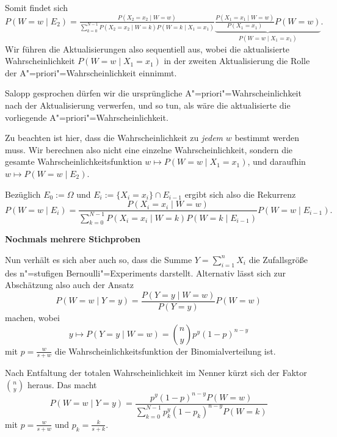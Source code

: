 \documentclass[8pt]{beamer}
\newcommand{\strong}[1]{\textsf{\textbf{#1}}}
\newcommand{\parspace}{\vspace{0.8em}}
\newcommand{\centerheadline}[1]{%
  \begin{center}\strong{#1}\end{center}}
\begin{document}
\begin{frame}
Somit findet sich
\[P(W=w\mid E_2) = \tfrac{P(X_2=x_2\mid W=w)}{\sum_{k=0}^{N-1} P(X_2=x_2\mid W=k)P(W=k\mid X_1=x_1)}\underbrace{\tfrac{P(X_1=x_1\mid W=w)}{P(X_1=x_1)}P(W=w)}_{P(W=w\mid X_1=x_1)}.\]\pause
Wir führen die Aktualisierungen also sequentiell aus, wobei die
aktualisierte Wahrscheinlichkeit $P(W=w\mid X_1=x_1)$ in der zweiten
Aktualisierung die Rolle der A"=priori"=Wahrscheinlichkeit einnimmt.\pause

\parspace
Salopp gesprochen dürfen wir die ursprüngliche A"=priori"=Wahrscheinlichkeit
nach der Aktualisierung verwerfen, und so tun, als wäre die aktualisierte
die vorliegende A"=priori"=Wahrscheinlichkeit.\pause

\parspace
Zu beachten ist hier, dass die Wahrscheinlichkeit zu \emph{jedem} $w$ bestimmt
werden muss. Wir berechnen also nicht eine einzelne Wahrscheinlichkeit, sondern
die gesamte Wahrscheinlichkeitsfunktion $w\mapsto P(W=w\mid X_1=x_1)$,
und daraufhin $w\mapsto P(W=w\mid E_2)$.
\end{frame}

\begin{frame}
Bezüglich $E_0:=\Omega$ und $E_i:=\{X_i=x_i\}\cap E_{i-1}$ ergibt sich also die Rekurrenz
\[P(W=w\mid E_i) = \frac{P(X_i=x_i\mid W=w)}{\sum_{k=0}^{N-1}
P(X_i=x_i\mid W=k)P(W=k\mid E_{i-1})}P(W=w\mid E_{i-1}).\]
\end{frame}

\begin{frame}
\centerheadline{Nochmals mehrere Stichproben}
\end{frame}

\begin{frame}
Nun verhält es sich aber auch so, dass die Summe $Y=\sum_{i=1}^n X_i$
die Zufallsgröße des n"=stufigen Bernoulli"=Experiments darstellt.
Alternativ lässt sich zur Abschätzung also auch der Ansatz
\[P(W=w\mid Y=y) = \frac{P(Y=y\mid W=w)}{P(Y=y)}P(W=w)\]
machen, wobei
\[y\mapsto P(Y=y\mid W=w) = \binom{n}{y}p^y(1-p)^{n-y}\]
mit $p=\frac{w}{s+w}$ die Wahrscheinlichkeitsfunktion der
Binomialverteilung ist.
\end{frame}

\begin{frame}
Nach Entfaltung der totalen Wahrscheinlichkeit im Nenner kürzt
sich der Faktor $\binom{n}{y}$ heraus. Das macht
\[P(W=w\mid Y=y) = \frac{p^y(1-p)^{n-y}P(W=w)}{
\sum_{k=0}^{N-1}p_k^y(1-p_k)^{n-y}P(W=k)}\]
mit $p=\frac{w}{s+w}$ und $p_k = \frac{k}{s+k}$.
\end{frame}
\end{document}
